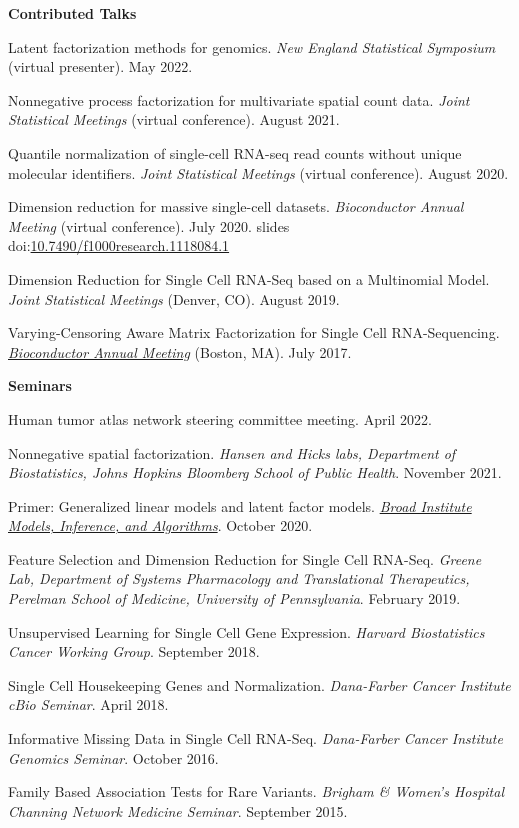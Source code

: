 \documentclass[10pt]{article}
\newcommand\doilink[1]{\href{https://dx.doi.org/#1}{#1}}
\newcommand\doi[1]{doi:\doilink{#1}}
\begin{document}
\textbf{Contributed Talks}
\begin{enumerate}[label= {[\arabic*]}]
\item Latent factorization methods for genomics. {\it New England Statistical Symposium} (virtual presenter). May 2022.
\item Nonnegative process factorization for multivariate spatial count data. {\it Joint Statistical Meetings} (virtual conference). August 2021.
\item Quantile normalization of single-cell RNA-seq read counts without unique molecular identifiers. {\it Joint Statistical Meetings} (virtual conference). August 2020.
\item Dimension reduction for massive single-cell datasets. {\it Bioconductor Annual Meeting} (virtual conference). July 2020. slides \doi{10.7490/f1000research.1118084.1}
\item Dimension Reduction for Single Cell RNA-Seq based on a Multinomial Model. {\it Joint Statistical Meetings} (Denver, CO). August 2019.
\item Varying-Censoring Aware Matrix Factorization for Single Cell RNA-Sequencing. \href{https://www.bioconductor.org/help/course-materials/2017/BioC2017/}{{\it Bioconductor Annual Meeting}} (Boston, MA). July 2017.
\end{enumerate}

\textbf{Seminars}
\begin{enumerate}[label= {[\arabic*]}]
\item Human tumor atlas network steering committee meeting. April 2022.
\item Nonnegative spatial factorization. {\it Hansen and Hicks labs, Department of Biostatistics, Johns Hopkins Bloomberg School of Public Health}. November 2021.
\item Primer: Generalized linear models and latent factor models. \href{https://www.broadinstitute.org/talks/primer-generalized-linear-models-and-latent-factor-models}{{\it Broad Institute Models, Inference, and Algorithms}}. October 2020.
\item Feature Selection and Dimension Reduction for Single Cell RNA-Seq. {\it Greene Lab, Department of Systems Pharmacology and Translational Therapeutics, Perelman School of Medicine, University of Pennsylvania}. February 2019.
\item Unsupervised Learning for Single Cell Gene Expression. {\it Harvard Biostatistics Cancer Working Group}. September 2018.
\item Single Cell Housekeeping Genes and Normalization. {\it Dana-Farber Cancer Institute cBio Seminar}. April 2018.
\item Informative Missing Data in Single Cell RNA-Seq. {\it Dana-Farber Cancer Institute Genomics Seminar}. October 2016.
\item Family Based Association Tests for Rare Variants. {\it Brigham \& Women's Hospital Channing Network Medicine Seminar}. September 2015.
\end{enumerate}
\end{document}
